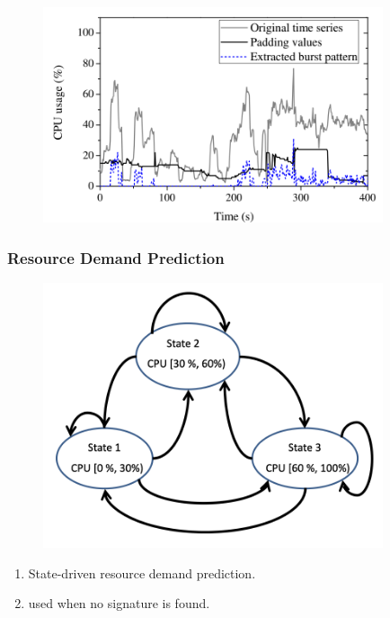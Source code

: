 \documentclass[acmlarge]{acmart}
\begin{document}
\begin{figure}[htbp]
  \centering
  \includegraphics[width=10cm]{./pattern.png}
\end{figure}
\subsubsection{Resource Demand Prediction}
\begin{figure}[htbp]
  \centering
  \includegraphics[width=10cm]{./resource_demand.png}
\end{figure}
\begin{enumerate}
  \item State-driven resource demand prediction.
  \item used when no signature is found.
\end{enumerate}
\end{document}
